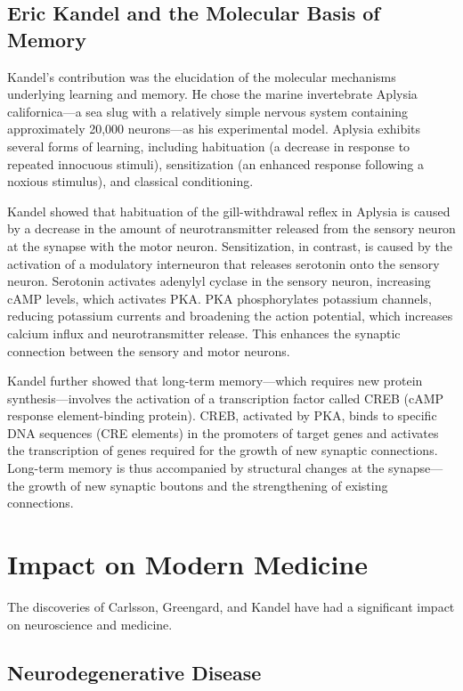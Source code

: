 \subsection{Eric Kandel and the Molecular Basis of Memory}

Kandel's contribution was the elucidation of the molecular mechanisms underlying learning and memory. He chose the marine invertebrate Aplysia californica---a sea slug with a relatively simple nervous system containing approximately 20,000 neurons---as his experimental model. Aplysia exhibits several forms of learning, including habituation (a decrease in response to repeated innocuous stimuli), sensitization (an enhanced response following a noxious stimulus), and classical conditioning.

Kandel showed that habituation of the gill-withdrawal reflex in Aplysia is caused by a decrease in the amount of neurotransmitter released from the sensory neuron at the synapse with the motor neuron. Sensitization, in contrast, is caused by the activation of a modulatory interneuron that releases serotonin onto the sensory neuron. Serotonin activates adenylyl cyclase in the sensory neuron, increasing cAMP levels, which activates PKA. PKA phosphorylates potassium channels, reducing potassium currents and broadening the action potential, which increases calcium influx and neurotransmitter release. This enhances the synaptic connection between the sensory and motor neurons.

Kandel further showed that long-term memory---which requires new protein synthesis---involves the activation of a transcription factor called CREB (cAMP response element-binding protein). CREB, activated by PKA, binds to specific DNA sequences (CRE elements) in the promoters of target genes and activates the transcription of genes required for the growth of new synaptic connections. Long-term memory is thus accompanied by structural changes at the synapse---the growth of new synaptic boutons and the strengthening of existing connections.

\section{Impact on Modern Medicine}

The discoveries of Carlsson, Greengard, and Kandel have had a significant impact on neuroscience and medicine.

\subsection{Neurodegenerative Disease}

